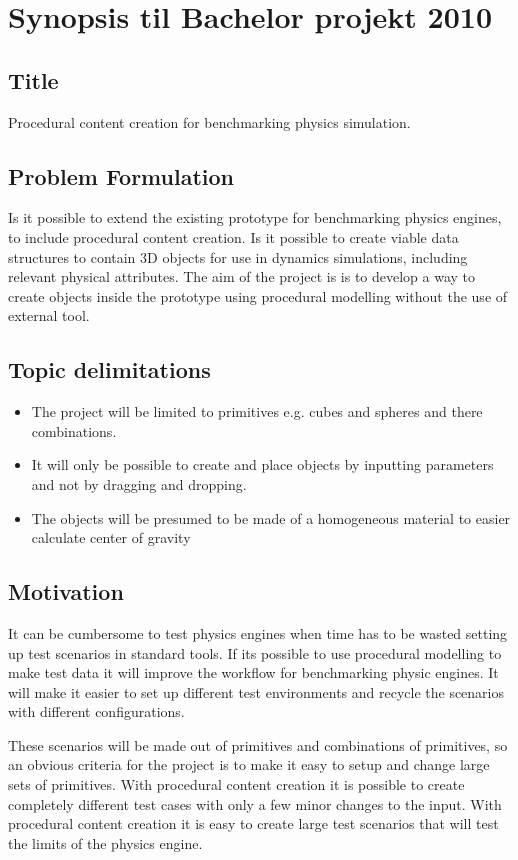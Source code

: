 \documentclass[a4paper, 10pt]{article}
\begin{document}
\section*{Synopsis til Bachelor projekt 2010}
\subsection*{Title}
Procedural content creation for benchmarking physics simulation.
\subsection*{Problem Formulation}
Is it possible to extend the existing prototype for benchmarking physics engines, to include procedural content
creation.
Is it possible to create viable data structures to contain 3D objects for use in dynamics simulations, including relevant physical attributes. The aim of the
project is is to develop a way to create objects inside the prototype using procedural modelling without the use of external tool.

\subsection*{Topic delimitations}
	\begin{itemize}
	\item The project will be limited to primitives e.g. cubes and spheres and there combinations. 
	\item It will only be possible to create and place objects by inputting parameters and not by dragging and
	dropping.
	\item The objects will be presumed to be made of a homogeneous material to easier calculate center of gravity
	\end{itemize}
\subsection*{Motivation}
It can be cumbersome to test physics engines when time has to be wasted
setting up test scenarios in standard tools. If its possible to use procedural modelling to make test data it will
improve the workflow for benchmarking physic engines. It will make it easier to set up different test environments and recycle the scenarios with
different configurations. 

These scenarios will be made out of primitives and combinations of primitives, so an obvious criteria for the project is to make it 
easy to setup and change large sets of primitives.
With procedural content creation it is possible to create completely different test cases with only a few minor changes
to the input. With procedural content creation it is easy to create large test scenarios that will test the limits of the
physics engine. 
\end{document}
